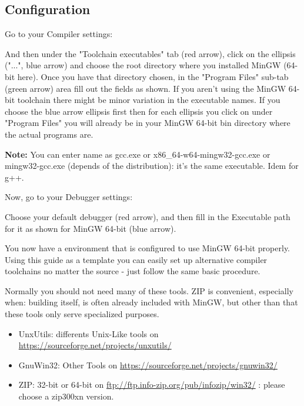\newpage
\subsection{\codeblocks Configuration}

Go to your Compiler settings:


And then under the "Toolchain executables" tab (red arrow), click on the ellipsis ("...", blue arrow) and choose the root directory where you installed MinGW (64-bit here). Once you have that directory chosen, in the "Program Files" sub-tab (green arrow) area fill out the fields as shown. If you aren't using the MinGW 64-bit toolchain there might be minor variation in the executable names. If you choose the blue arrow ellipsis first then for each ellipsis you click on under "Program Files" you will already be in your MinGW 64-bit bin directory where the actual programs are.


\textbf{Note:} You can enter name as gcc.exe or x86\_64-w64-mingw32-gcc.exe or mingw32-gcc.exe (depends of the distribution): it's the same executable. Idem for g++.



Now, go to your Debugger settings:


Choose your default debugger (red arrow), and then fill in the Executable path for it as shown for MinGW 64-bit (blue arrow).



You now have a \codeblocks environment that is configured to use MinGW 64-bit properly. Using this guide as a template you can easily set up alternative compiler toolchains no matter the source - just follow the same basic procedure.

Normally you should not need many of these tools. ZIP is convenient, especially when: building \codeblocks itself, is often already included with MinGW, but other than that these tools only serve specialized purposes.
\begin{itemize}
\item UnxUtils: differents Unix-Like tools on \url{https://sourceforge.net/projects/unxutils/}
\item GnuWin32: Other Tools on \url{https://sourceforge.net/projects/gnuwin32/}
\item ZIP: 32-bit or 64-bit on \url{ftp://ftp.info-zip.org/pub/infozip/win32/} : please choose a zip300xn version.
\end{itemize}

